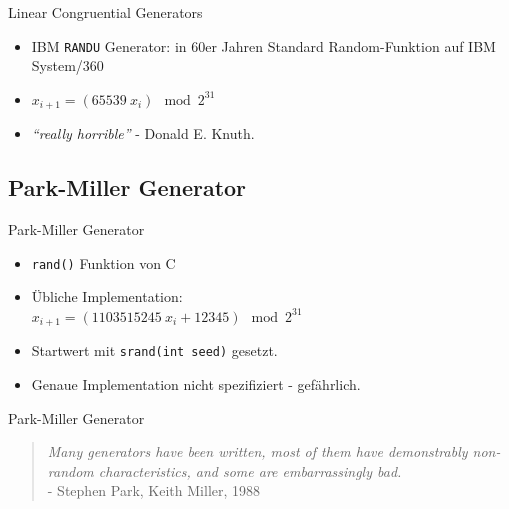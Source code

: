 \documentclass{beamer}
\begin{document}
\begin{frame}{Linear Congruential Generators}
	\begin{itemize}
		\item IBM \texttt{RANDU} Generator: in 60er Jahren Standard Random-Funktion auf IBM System/360
		\item $x_{i+1} = \left( 65539 \: x_i \right) \mod{2^{31}}$ 
		\item<4-> \textit{``really horrible''} - Donald E. Knuth.
	\end{itemize}
\end{frame}

\subsection{Park-Miller Generator}
\begin{frame}{Park-Miller Generator}

	\begin{itemize}
		\item \texttt{rand()} Funktion von C
		\item Übliche Implementation: \\ $x_{i+1} =  \left( 1103515245 \: x_i + 12345\right) \mod{2^{31}}$
		\item Startwert mit \texttt{srand(int seed)} gesetzt. 
		\item Genaue Implementation nicht spezifiziert - gefährlich.
	\end{itemize}
\end{frame}

\begin{frame}{Park-Miller Generator}
	\begin{quote}
		\textit{Many generators have been written, most of them have demonstrably non-random characteristics, and some are embarrassingly bad.} \\ - Stephen Park, Keith Miller, 1988
	\end{quote}	
\end{frame}
\end{document}
